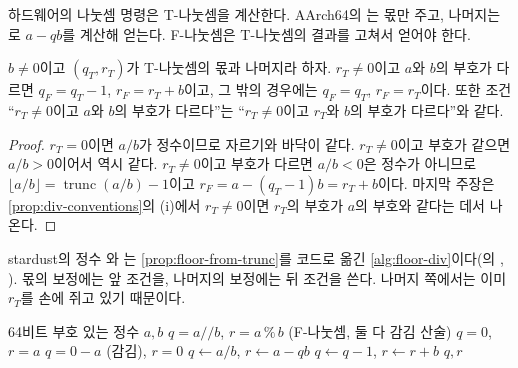 하드웨어의 나눗셈 명령은 T-나눗셈을 계산한다. AArch64의 는 몫만 주고, 나머지는 로 $a-qb$를 계산해 얻는다. F-나눗셈은 T-나눗셈의 결과를 고쳐서 얻어야 한다.

\begin{proposition}
\label{prop:floor-from-trunc}
$b\neq0$이고 $(q_T,r_T)$가 T-나눗셈의 몫과 나머지라 하자. $r_T\neq0$이고 $a$와 $b$의 부호가 다르면 $q_F=q_T-1$, $r_F=r_T+b$이고, 그 밖의 경우에는 $q_F=q_T$, $r_F=r_T$이다. 또한 조건 ``$r_T\neq0$이고 $a$와 $b$의 부호가 다르다''는 ``$r_T\neq0$이고 $r_T$와 $b$의 부호가 다르다''와 같다.
\end{proposition}

\begin{proof}
$r_T=0$이면 $a/b$가 정수이므로 자르기와 바닥이 같다. $r_T\neq0$이고 부호가 같으면 $a/b>0$이어서 역시 같다. $r_T\neq0$이고 부호가 다르면 $a/b<0$은 정수가 아니므로 $\lfloor a/b\rfloor=\operatorname{trunc}(a/b)-1$이고 $r_F=a-(q_T-1)b=r_T+b$이다. 마지막 주장은 \cref{prop:div-conventions}의 (i)에서 $r_T\neq0$이면 $r_T$의 부호가 $a$의 부호와 같다는 데서 나온다.
\end{proof}

stardust의 정수 와 는 \cref{prop:floor-from-trunc}를 코드로 옮긴 \cref{alg:floor-div}이다(의 , ). 몫의 보정에는 앞 조건을, 나머지의 보정에는 뒤 조건을 쓴다. 나머지 쪽에서는 이미 $r_T$를 손에 쥐고 있기 때문이다.

\begin{algorithm}[htbp]
\begin{algorithmic}[1]
\Require 64비트 부호 있는 정수 $a,b$
\Ensure $q=a\mathbin{/\!/}b$, $r=a\mathbin{\%}b$ (F-나눗셈, 둘 다 감김 산술)
 \Return $q=0$, $r=a$ 
\EndIf
{} \Return $q=0-a$ (감김), $r=0$ 
\EndIf
\State $q\gets a/b$, $r\gets a-qb$ 
  \State $q\gets q-1$, $r\gets r+b$ 
\EndIf
\State \Return $q,r$
\end{algorithmic}
\caption{정수의 바닥 나눗셈과 나머지 (stardust , )}
\label{alg:floor-div}
\end{algorithm}

